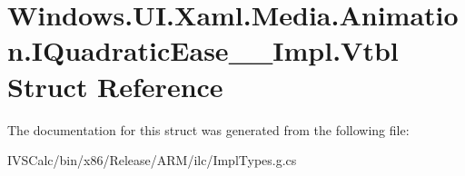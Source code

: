 \hypertarget{struct_windows_1_1_u_i_1_1_xaml_1_1_media_1_1_animation_1_1_i_quadratic_ease_____impl_1_1_vtbl}{}\section{Windows.\+U\+I.\+Xaml.\+Media.\+Animation.\+I\+Quadratic\+Ease\+\_\+\+\_\+\+Impl.\+Vtbl Struct Reference}
\label{struct_windows_1_1_u_i_1_1_xaml_1_1_media_1_1_animation_1_1_i_quadratic_ease_____impl_1_1_vtbl}


The documentation for this struct was generated from the following file\+:\begin{DoxyCompactItemize}
\item 
I\+V\+S\+Calc/bin/x86/\+Release/\+A\+R\+M/ilc/Impl\+Types.\+g.\+cs\end{DoxyCompactItemize}
